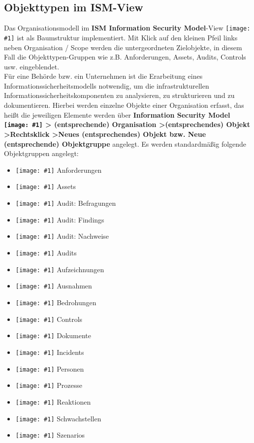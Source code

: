 \documentclass[a4paper,10pt]{book}
\newcommand{\icon}[1]{\texttt{[image: \#1]}}
\begin{document}
\subsection{Objekttypen im ISM-View}
Das Organisationsmodell im \textbf{ISM Information Security Model}-View \icon{Icon/Informationssicherheitsmodell.png}
ist als Baumstruktur implementiert.
Mit Klick auf den kleinen Pfeil links neben Organisation / Scope werden die untergeordneten Zielobjekte, in diesem Fall die Objekttypen-Gruppen wie
z.B. Anforderungen, Assets, Audits, Controls usw. eingeblendet.
\newline\\
Für eine Behörde bzw. ein Unternehmen ist die Erarbeitung eines Informationssicherheitsmodells notwendig, um die infrastrukturellen
Informationssicherheitskomponenten zu analysieren, zu strukturieren und zu dokumentieren. Hierbei werden einzelne Objekte einer Organisation erfasst,
das heißt die jeweiligen Elemente werden über \textbf {Information Security Model \icon{Icon/Informationssicherheitsmodell.png} \textgreater
(entsprechende) Organisation \textgreater (entsprechendes) Objekt \textgreater Rechtsklick \textgreater Neues (entsprechendes)
Objekt bzw. Neue (entsprechende) Objektgruppe} angelegt. Es werden standardmäßig folgende Objektgruppen angelegt:
\begin{itemize}
\item \icon{Icon/16-paper-gavel-alt.png} Anforderungen
\item \icon{Icon/Asset.png} Assets
\item \icon{Icon/Clipboard_comment.png} Audit: Befragungen
\item \icon{Icon/Clipboard_report.png} Audit: Findings
\item \icon{Icon/Clipboard_eye.png} Audit: Nachweise
\item \icon{Icon/Clipboard_audit.png} Audits
\item \icon{Icon/Text.png} Aufzeichnungen
\item \icon{Icon/16-paper-excerpt-yellow.png} Ausnahmen
\item \icon{Icon/Lightening.png} Bedrohungen
\item \icon{Icon/Controls.png} Controls
\item \icon{Icon/Document.png} Dokumente
\item \icon{Icon/Incident.png} Incidents
\item \icon{Icon/Mitarbeiter.png} Personen
\item \icon{Icon/Prozesse.png} Prozesse
\item \icon{Icon/Reaktionen.png} Reaktionen
\item \icon{Icon/Schwachstellen.png} Schwachstellen
\item \icon{Icon/Szenarios.png} Szenarios
\end{itemize}
\end{document}
